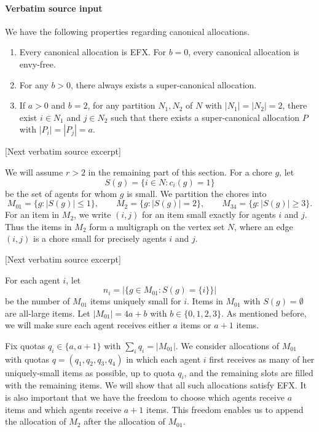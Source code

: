 \documentclass[10pt]{article}
\begin{document}
\paragraph{Verbatim source input}
\begin{ReviewVerbatim}
\begin{lemma}\label{lem:canonical}
    We have the following properties regarding canonical allocations.
    \begin{enumerate}[label=(\alph*)]
        \item Every canonical allocation is EFX. For $b=0$, every canonical allocation is envy-free.
        \item For any $b>0$, there always exists a super-canonical allocation.
        \item If $a>0$ and $b=2$, for any partition $N_1,N_2$ of $N$ with $|N_1|=|N_2|=2$, there exist $i\in N_1$ and $j\in N_2$ such that there exists a super-canonical allocation $P$ with $|P_i|=|P_j|=a$.
    \end{enumerate}
\end{lemma}

[Next verbatim source excerpt]

We will assume $r>2$ in the remaining part of this section.
For a chore $g$, let
\[
 S(g)=\{i\in N:c_i(g)=1\}
\]
be the set of agents for whom $g$ is small.  We partition the chores into
\[
M_{01}=\{g:|S(g)|\le 1\},\qquad
M_2=\{g:|S(g)|=2\},\qquad
M_{34}=\{g:|S(g)|\ge 3\}.
\]
For an item in $M_2$, we write $(i,j)$ for an item small exactly for agents
$i$ and $j$.  Thus the items in $M_2$ form a multigraph on the vertex set
$N$, where an edge $(i,j)$ is a chore small for precisely agents $i$ and $j$.

[Next verbatim source excerpt]

For each agent $i$, let
\[
 n_i=\left|\{g\in M_{01}:S(g)=\{i\}\}\right|
\]
be the number of $M_{01}$ items uniquely small for $i$.  Items in $M_{01}$
with $S(g)=\emptyset$ are all-large items.
Let $|M_{01}|=4a+b$ with $b\in\{0,1,2,3\}$.
As mentioned before, we will make sure each agent receives either $a$ items or $a+1$ items.

Fix quotas $q_i\in\{a,a+1\}$ with $\sum_i q_i=|M_{01}|$.
We consider allocations of $M_{01}$ with quotas $q=(q_1,q_2,q_3,q_4)$ in which each agent $i$ first receives as many of her uniquely-small items as possible, up to quota $q_i$, and the remaining slots are filled with the remaining items.
We will show that all such allocations satisfy EFX.
It is also important that we have the freedom to choose which agents receive $a$ items and which agents receive $a+1$ items.
This freedom enables us to append the allocation of $M_2$ after the allocation of $M_{01}$.


\end{ReviewVerbatim}
\end{document}
